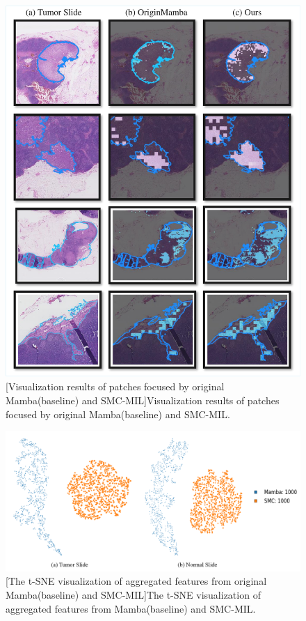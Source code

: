 \begin{figure}[h!]
  \centering
  \includegraphics[width=0.8\columnwidth]{figures/Visualize_cropped.pdf}
  [Visualization results of patches focused by original Mamba(baseline) and SMC-MIL]{Visualization results of patches focused by original Mamba(baseline) and SMC-MIL.}
  \label{figure4: visualize}
\end{figure}

\begin{figure}[h!]
  \centering
  \includegraphics[width=0.8\columnwidth]{figures/t-SNE.png}
  [The t-SNE visualization of aggregated features from original Mamba(baseline) and SMC-MIL]{The t-SNE visualization of aggregated features from Mamba(baseline) and SMC-MIL.}
  \label{figure4: tSNE}
\end{figure}


